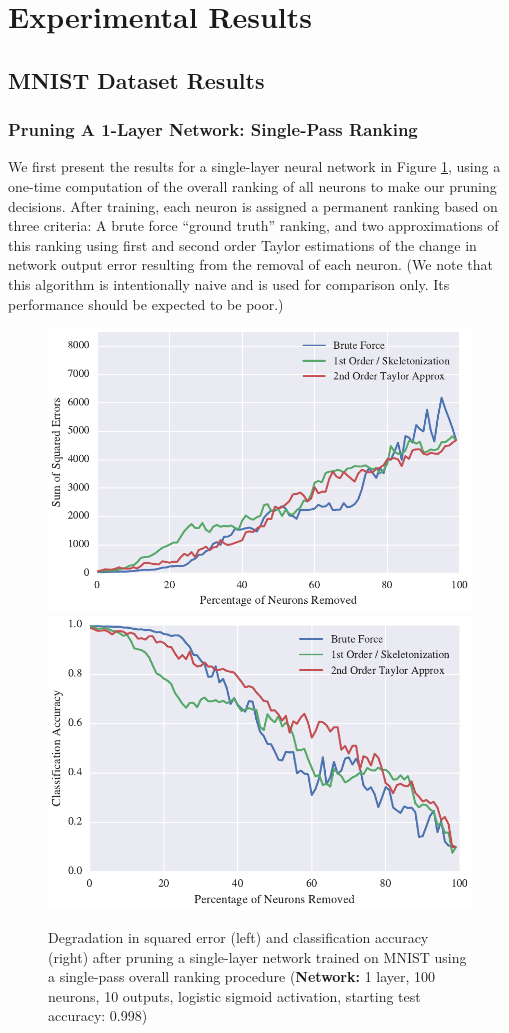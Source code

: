 \section{Experimental Results}
\subsection{MNIST Dataset Results}
\subsubsection{Pruning A 1-Layer Network: Single-Pass Ranking}
We first present the results for a single-layer neural network in Figure \ref{fig:mnist-single-ranking-single-layer}, using a one-time computation of the overall ranking of all neurons to make our pruning decisions. After training, each neuron is assigned a permanent ranking based on three criteria: A brute force ``ground truth'' ranking, and two approximations of this ranking using first and second order Taylor estimations of the change in network output error resulting from the removal of each neuron. (We note that this algorithm is intentionally naive and is used for comparison only. Its performance should be expected to be poor.) 

\begin{figure}[!h]
\centering
\includegraphics[width=0.49\linewidth]{png/mnist-acc99-single-pass-method.pdf}
\includegraphics[width=0.49\linewidth]{png/mnist-acc99-single-pass-accuracy.pdf}
\caption{Degradation in squared error (left) and classification accuracy (right) after pruning a single-layer network trained on MNIST using a single-pass overall ranking procedure (\textbf{Network:} 1 layer, 100 neurons, 10 outputs, logistic sigmoid activation, starting test accuracy: 0.998)}
\label{fig:mnist-single-ranking-single-layer}
\end{figure}

